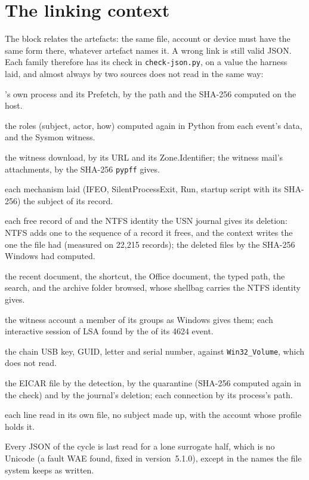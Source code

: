 \documentclass[11pt,a4paper,oneside]{report}
\begin{document}
\section{The linking context}

The  block relates the artefacts: the same file, account or
device must have the same form there, whatever artefact names it. A wrong link
is still valid JSON. Each family therefore has its check in
\texttt{check-json.py}, on a value the harness laid, and almost always by two
sources \wac{} does not read in the same way:
\begin{description}[style=nextline,leftmargin=1.2em]
  \item[Executions] \wac{}'s own process and its Prefetch, by the path and
    the SHA-256 computed on the host.
  \item[Events] the roles (subject, actor, how) computed again in Python
    from each event's data, and the Sysmon witness.
  \item[Arrivals] the witness download, by its URL and its Zone.Identifier;
    the witness mail's attachments, by the SHA-256 \texttt{pypff} gives.
  \item[Persistence] each mechanism laid (IFEO, SilentProcessExit, Run,
    startup script with its SHA-256) the subject of its record.
  \item[File system] each free record of  and the NTFS
    identity the USN journal gives its deletion: NTFS adds one to the
    sequence of a record it frees, and the context writes the one the file
    had (measured on 22,215 records); the deleted files by the SHA-256
    Windows had computed.
  \item[Accesses] the recent document, the shortcut, the Office document,
    the typed path, the search, and the archive folder browsed, whose
    shellbag carries the NTFS identity  gives.
  \item[Accounts and sessions] the witness account a member of its groups as
    Windows gives them; each interactive session of LSA found by the
     of its 4624 event.
  \item[Devices and volumes] the chain USB key, GUID, letter and serial
    number, against \texttt{Win32\_Volume}, which \wac{} does not read.
  \item[Network and defence] the EICAR file by the detection, by the
    quarantine (SHA-256 computed again in the check) and by the journal's
    deletion; each connection by its process's path.
  \item[Application traces] each line read in its own file, no subject made
    up, with the account whose profile holds it.
\end{description}
Every JSON of the cycle is last read for a lone surrogate half, which is no
Unicode (a fault WAE found, fixed in version~5.1.0), except in the names the
file system keeps as written.
\end{document}
